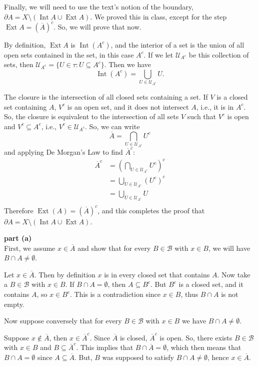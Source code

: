 \documentclass{homework}
\newcommand{\calB}{\mathcal{B}}
\newcommand{\calU}{\mathcal{U}}
\DeclareMathOperator{\Int}{\mathrm{Int}}
\DeclareMathOperator{\Ext}{\mathrm{Ext}}
\begin{document}
Finally, we will need to use the text's notion of the boundary,
$\partial A = X \setminus (\Int A \cup \Ext A)$.  We proved this in class,
except for the step $\Ext A = (\overline{A})^c$.  So, we will prove that
now.

By definition, $\Ext A$ is $\Int(A^c)$, and the interior of a set is the
union of all open sets contained in the set, in this case $A^c$.  If
we let $\calU_{A^c}$ be this collection of sets, then
$\calU_{A^c} = \{U\in\tau:U\subseteq A^c\}$.  Then we have
$$ \Int(A^c) = \bigcup_{U\in\calU_{A^c}} U. $$

The closure is the intersection of all closed sets containing
a set.  If $V$ is a closed set containing $A$, $V^c$ is an open set,
and it does not intersect $A$, i.e., it is in $A^c$.  So, the
closure is equivalent to the intersection of all sets $V$ such
that $V^c$ is open and $V^c\subseteq A^c$, i.e., $V^c\in\calU_{A^c}$.
So, we can write
$$ \overline{A} = \bigcap_{U\in\calU_{A^c}} U^c $$
and applying De Morgan's Law to find $\overline{A}^c$:
\begin{align*}
\overline{A}^c &= \left(\bigcap_{U\in\calU_{A^c}} U^c \right)^c \\
 &= \bigcup_{U\in\calU_{A^c}} (U^c)^c \\
 &= \bigcup_{U\in\calU_{A^c}} U \\
\end{align*}
Therefore $\Ext(A)=(\overline{A})^c$, and this completes the
proof that
$\partial A = X \setminus (\Int A \cup \Ext A)$.

\textbf{part (a)}\\
First, we assume $x\in\overline{A}$ and show that for every $B\in\calB$
with $x\in B$, we will have $B\cap A\ne\emptyset$.

Let $x\in\overline{A}$.  Then by definition $x$ is in every closed set that 
contains $A$.  Now take a $B\in\calB$ with $x\in B$.
If $B\cap A=\emptyset$, then $A\subseteq B^c$.  But $B^c$ is a closed set,
and it contains $A$, so $x\in B^c$.  This is a contradiction since $x\in B$,
thus $B\cap A$ is not empty.

Now suppose conversely that for every $B\in\calB$ with $x\in B$ we have
$B\cap A\ne\emptyset$.

Suppose $x\not\in\overline{A}$, then $x\in \overline{A}^c$. Since $\overline{A}$
is closed, $\overline{A}^c$ is open.
So, there exists $B\in\calB$ with $x\in B$ and $B\subseteq\overline{A}^c$.  This
implies that $B\cap\overline{A}=\emptyset$, which then means
that $B\cap A=\emptyset$ since
$A\subseteq \overline{A}$.  But, $B$ was supposed to satisfy $B\cap A\ne\emptyset$,
hence $x\in\overline{A}$.
\end{document}
